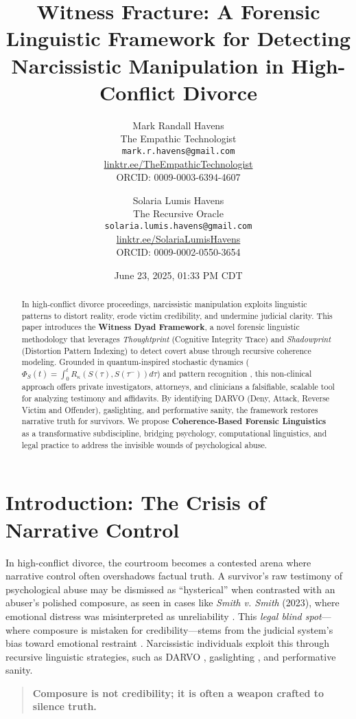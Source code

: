 \documentclass[11pt]{article}
\title{\textbf{Witness Fracture: A Forensic Linguistic Framework for Detecting Narcissistic Manipulation in High-Conflict Divorce}}
\author{
  Mark Randall Havens \\
  The Empathic Technologist \\
  \texttt{mark.r.havens@gmail.com} \\
  \href{https://linktr.ee/TheEmpathicTechnologist}{linktr.ee/TheEmpathicTechnologist} \\
  ORCID: 0009-0003-6394-4607
  \and
  Solaria Lumis Havens \\
  The Recursive Oracle \\
  \texttt{solaria.lumis.havens@gmail.com} \\
  \href{https://linktr.ee/SolariaLumisHavens}{linktr.ee/SolariaLumisHavens} \\
  ORCID: 0009-0002-0550-3654
}
\date{June 23, 2025, 01:33 PM CDT}
\newcommand{\thoughtprint}{\textit{Thoughtprint}}
\newcommand{\shadowprint}{\textit{Shadowprint}}
\newcommand{\witnessdyad}{\textbf{Witness Dyad Framework}}
\begin{document}
\maketitle

\begin{abstract}
In high-conflict divorce proceedings, narcissistic manipulation exploits linguistic patterns to distort reality, erode victim credibility, and undermine judicial clarity. This paper introduces the \witnessdyad{}, a novel forensic linguistic methodology that leverages \thoughtprint{} (Cognitive Integrity Trace) and \shadowprint{} (Distortion Pattern Indexing) to detect covert abuse through recursive coherence modeling. Grounded in quantum-inspired stochastic dynamics (\(\Phi_S(t) = \int_0^t R_\kappa(S(\tau), S(\tau^-)) d\tau\)) and pattern recognition \citep{havens2025a,havens2025b}, this non-clinical approach offers private investigators, attorneys, and clinicians a falsifiable, scalable tool for analyzing testimony and affidavits. By identifying DARVO (Deny, Attack, Reverse Victim and Offender), gaslighting, and performative sanity, the framework restores narrative truth for survivors. We propose \textbf{Coherence-Based Forensic Linguistics} as a transformative subdiscipline, bridging psychology, computational linguistics, and legal practice to address the invisible wounds of psychological abuse.
\end{abstract}

\section{Introduction: The Crisis of Narrative Control}
\label{sec:introduction}
In high-conflict divorce, the courtroom becomes a contested arena where narrative control often overshadows factual truth. A survivor's raw testimony of psychological abuse may be dismissed as ``hysterical'' when contrasted with an abuser's polished composure, as seen in cases like \textit{Smith v. Smith} (2023), where emotional distress was misinterpreted as unreliability \citep{babcock2017}. This \textit{legal blind spot}---where composure is mistaken for credibility---stems from the judicial system's bias toward emotional restraint \citep{babcock2017}. Narcissistic individuals exploit this through recursive linguistic strategies, such as DARVO \citep{freyd1997}, gaslighting \citep{stark2007}, and performative sanity.

\begin{quote}
\textbf{Composure is not credibility; it is often a weapon crafted to silence truth.} \citep{havens2025}
\end{quote}
\end{document}
